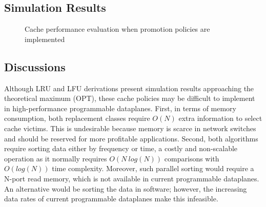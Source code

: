 \subsection{Simulation Results}
\begin{figure}[t]
	\centering
	\caption{Cache performance evaluation when promotion policies are implemented}
	\label{fig:promo_fig}
\end{figure}

\subsection{Discussions}

Although LRU and LFU derivations present simulation results approaching the theoretical maximum (OPT), these cache policies may be difficult to implement in high-performance programmable dataplanes.
First, in terms of memory consumption, both replacement classes require $O(N)$ extra information to select cache victims.
This is undesirable because memory is scarce in network switches and should be reserved for more profitable applications.
Second, both algorithms require sorting data either by frequency or time, a costly and non-scalable operation as it normally requires $O(N~log(N))$ comparisons with $O(log(N))$ time complexity.
Moreover, such parallel sorting would require a N-port read memory, which is not available in current programmable dataplanes.
An alternative would be sorting the data in software; however, the increasing data rates of current programmable dataplanes make this infeasible.  


